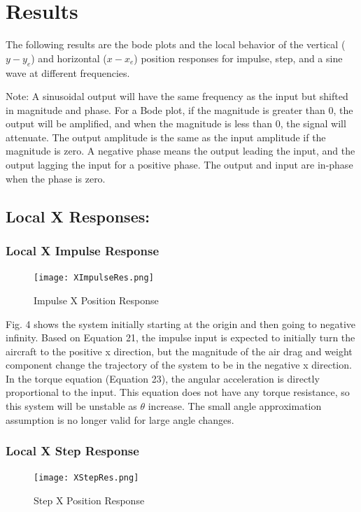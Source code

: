 \documentclass[conference]{IEEEtran}
\begin{document}
\section{Results}
The following results are the bode plots and the local behavior of the vertical ($y - y_e$) and horizontal ($x - x_e$) position responses for impulse, step, and a sine wave at different frequencies. 

Note: A sinusoidal output will have the same frequency as the input but shifted in magnitude and phase. For a Bode plot, if the magnitude is greater than 0, the output will be amplified, and when the magnitude is less than 0, the signal will attenuate. The output amplitude is the same as the input amplitude if the magnitude is zero. A negative phase means the output leading the input, and the output lagging the input for a positive phase. The output and input are in-phase when the phase is zero.

\subsection{Local X Responses:}
\subsubsection{Local X Impulse Response} 
\begin{figure}[htbp]
\centering
\centerline{\texttt{[image: XImpulseRes.png]}}
\caption{Impulse X Position Response}
\label{figure}
\end{figure}


Fig. 4 shows the system initially starting at the origin and then going to negative infinity. Based on Equation 21, the impulse input is expected to initially turn the aircraft to the positive x direction, but the magnitude of the air drag and weight component change the trajectory of the system to be in the negative x direction. In the torque equation (Equation 23), the angular acceleration is directly proportional to the input. This equation does not have any torque resistance, so this system will be unstable as $\theta$ increase. The small angle approximation assumption is no longer valid for large angle changes.  

\newpage
\subsubsection{Local X Step Response} 
\begin{figure}[htbp]
\centerline{\texttt{[image: XStepRes.png]}}
\caption{Step X Position Response}
\label{figure}
\end{figure}
\end{document}
